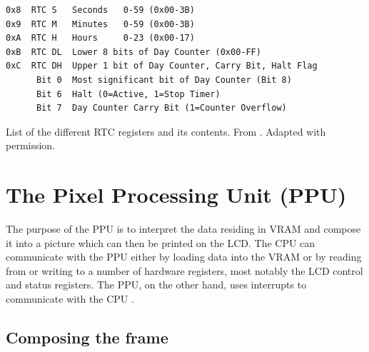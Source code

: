 \begin{table}[H]
    \begin{center}

\begin{BVerbatim}
0x8  RTC S   Seconds   0-59 (0x00-3B)
0x9  RTC M   Minutes   0-59 (0x00-3B)
0xA  RTC H   Hours     0-23 (0x00-17)
0xB  RTC DL  Lower 8 bits of Day Counter (0x00-FF)
0xC  RTC DH  Upper 1 bit of Day Counter, Carry Bit, Halt Flag
      Bit 0  Most significant bit of Day Counter (Bit 8)
      Bit 6  Halt (0=Active, 1=Stop Timer)
      Bit 7  Day Counter Carry Bit (1=Counter Overflow)
\end{BVerbatim}

    \caption{List of the different RTC registers and its contents. From \cite{pandocsmbc}. Adapted with permission.}
    \label{tab:rtc_registers}
    \end{center}
\end{table}




\section{The Pixel Processing Unit (PPU)}
\label{sec:PPU}

The purpose of the PPU is to interpret the data residing in VRAM and compose it into a picture which can then be printed on the LCD. The CPU can communicate with the PPU either by loading data into the VRAM or by reading from or writing to a number of hardware registers, most notably the LCD control and status registers. The PPU, on the other hand, uses interrupts to communicate with the CPU \cite{pandocsVideo}.

\subsection{Composing the frame}
\label{sec:PPU_image}


